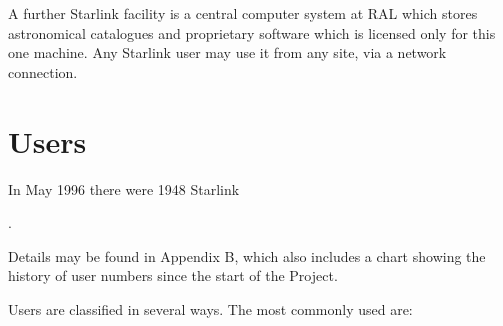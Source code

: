 A further Starlink facility is a central computer system at RAL which stores
astronomical catalogues and proprietary software which is licensed only for
this one machine.
Any Starlink user may use it from any site, via a network connection.

\newpage

\section*{Users}

In May 1996 there were 1948 Starlink 
{.
\begin{latexonly}
Details may be found in Appendix B, which also includes a chart showing the
history of user numbers since the start of the Project.
\end{latexonly}

Users are classified in several ways.
The most commonly used are:

}
